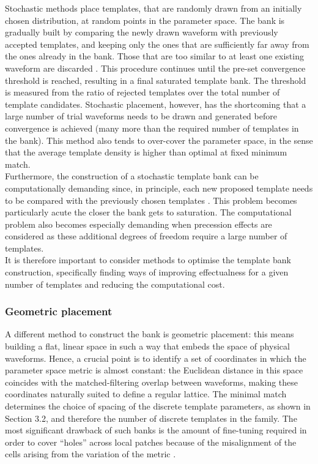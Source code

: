 \documentclass[binding=0.6cm, LaM]{sapthesis}
\begin{document}
	Stochastic methods place templates, 
	that are randomly drawn from an initially chosen distribution, 
	at random points in the parameter space.
	The bank is gradually built by comparing the newly drawn waveform
	with previously accepted templates, 
	and keeping only the ones that are sufficiently far away 
	from the ones already in the bank.
 	Those that are too similar to at least one existing waveform are discarded \cite{35}.
	This procedure continues until the pre-set convergence threshold is reached, 
	resulting in a final saturated template bank.
	The threshold is measured from the ratio of rejected templates over the total number of template candidates.
	Stochastic placement, however, has the shortcoming that 
	a large number of trial waveforms needs to be drawn and generated before convergence is achieved 
	(many more than the required number of templates in the bank). 
	This method also tends to over-cover the parameter space, 
	in the sense that the average template density is higher than optimal at fixed minimum match. \\
	Furthermore, the construction of a stochastic template bank 
	can be computationally demanding since, in principle, 
	each new proposed template needs to be compared 
	with the previously chosen templates \cite{36}. 
	This problem becomes particularly acute 
	the closer the bank gets to saturation. 
	The computational problem also becomes especially demanding 
	when precession effects are considered as these additional degrees 
	of freedom require a large number of templates. \\
	It is therefore important to consider methods to optimise the template bank construction, 
	specifically finding ways of improving effectualness for a given number 
	of templates and reducing the computational cost. 

\subsubsection{Geometric placement}


	A different method to construct the bank is geometric placement:
	this means building a flat, linear space in such a way that embeds the space of physical waveforms. 
	Hence, a crucial point is to identify a set of coordinates 
	in which the parameter space metric is almost constant: 
	the Euclidean distance in this space coincides with the matched-filtering overlap 
	between waveforms, making these coordinates naturally suited to define a regular lattice. 
	The minimal match determines the choice of spacing of the discrete template parameters, as shown in Section 3.2, 
	and therefore the number of discrete templates in the family.
	The most significant drawback of such banks is the amount of fine-tuning required 
	in order to cover ``holes'' across local patches because of the misalignment 
	of the cells arising from the variation of the metric \cite{29}. 
\end{document}

